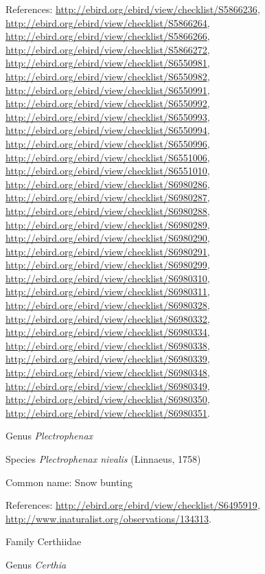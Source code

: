 \documentclass[9pt, article]{memoir}
\begin{document}
\begin{multicols}{2}
References: 
\url{http://ebird.org/ebird/view/checklist/S5866236}, 
\url{http://ebird.org/ebird/view/checklist/S5866264}, 
\url{http://ebird.org/ebird/view/checklist/S5866266}, 
\url{http://ebird.org/ebird/view/checklist/S5866272}, 
\url{http://ebird.org/ebird/view/checklist/S6550981}, 
\url{http://ebird.org/ebird/view/checklist/S6550982}, 
\url{http://ebird.org/ebird/view/checklist/S6550991}, 
\url{http://ebird.org/ebird/view/checklist/S6550992}, 
\url{http://ebird.org/ebird/view/checklist/S6550993}, 
\url{http://ebird.org/ebird/view/checklist/S6550994}, 
\url{http://ebird.org/ebird/view/checklist/S6550996}, 
\url{http://ebird.org/ebird/view/checklist/S6551006}, 
\url{http://ebird.org/ebird/view/checklist/S6551010}, 
\url{http://ebird.org/ebird/view/checklist/S6980286}, 
\url{http://ebird.org/ebird/view/checklist/S6980287}, 
\url{http://ebird.org/ebird/view/checklist/S6980288}, 
\url{http://ebird.org/ebird/view/checklist/S6980289}, 
\url{http://ebird.org/ebird/view/checklist/S6980290}, 
\url{http://ebird.org/ebird/view/checklist/S6980291}, 
\url{http://ebird.org/ebird/view/checklist/S6980299}, 
\url{http://ebird.org/ebird/view/checklist/S6980310}, 
\url{http://ebird.org/ebird/view/checklist/S6980311}, 
\url{http://ebird.org/ebird/view/checklist/S6980328}, 
\url{http://ebird.org/ebird/view/checklist/S6980332}, 
\url{http://ebird.org/ebird/view/checklist/S6980334}, 
\url{http://ebird.org/ebird/view/checklist/S6980338}, 
\url{http://ebird.org/ebird/view/checklist/S6980339}, 
\url{http://ebird.org/ebird/view/checklist/S6980348}, 
\url{http://ebird.org/ebird/view/checklist/S6980349}, 
\url{http://ebird.org/ebird/view/checklist/S6980350}, 
\url{http://ebird.org/ebird/view/checklist/S6980351}.

\vspace{6pt}\noindent\hspace{30pt}Genus \textit{Plectrophenax}


\vspace{6pt}\noindent\hspace{36pt}Species \textit{Plectrophenax nivalis} (Linnaeus, 1758)


Common name: Snow bunting

References: 
\url{http://ebird.org/ebird/view/checklist/S6495919}, 
\url{http://www.inaturalist.org/observations/134313}.

\vspace{6pt}\noindent\hspace{24pt}Family Certhiidae


\vspace{6pt}\noindent\hspace{30pt}Genus \textit{Certhia}



\end{multicols}
\end{document}
